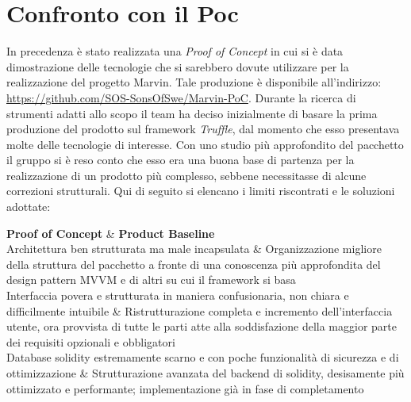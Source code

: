 \section{Confronto con il Poc}
In precedenza è stato realizzata una \emph{Proof of Concept} in cui si è data dimostrazione delle tecnologie che si sarebbero dovute utilizzare per la realizzazione del progetto Marvin.
Tale produzione è disponibile all'indirizzo: \url{https://github.com/SOS-SonsOfSwe/Marvin-PoC}.
Durante la ricerca di strumenti adatti allo scopo il team ha deciso inizialmente di basare la prima produzione del prodotto sul framework \emph{Truffle}, dal momento che esso presentava molte delle tecnologie di interesse.
Con uno studio più approfondito del pacchetto il gruppo si è reso conto che esso era una buona base di partenza per la realizzazione di un prodotto più complesso, sebbene necessitasse di alcune correzioni strutturali. Qui di seguito si elencano i limiti riscontrati e le soluzioni adottate:
\begin{longtable}
	\hline
	\textbf{Proof of Concept} & \textbf{Product Baseline} \\
	
	\hline Architettura ben strutturata ma male incapsulata
	&
	Organizzazione migliore della struttura del pacchetto a fronte di una conoscenza più approfondita del design pattern MVVM e di altri su cui il framework si basa \\ 
	
	\hline Interfaccia povera e strutturata in maniera confusionaria, non chiara e difficilmente intuibile 
	&
	Ristrutturazione completa e incremento dell'interfaccia utente, ora provvista di tutte le parti atte alla soddisfazione della maggior parte dei requisiti opzionali e obbligatori \\ 
	
	\hline Database solidity estremamente scarno e con poche funzionalità di sicurezza e di ottimizzazione
	&
	Strutturazione avanzata del backend di solidity, desisamente più ottimizzato e performante; implementazione già in fase di completamento \\ 
\caption[Tracciamento Use case-Requisiti]{Tracciamento Use case-Requisiti}
\label{tab:Confronto PoC PB}
\end{longtable}
